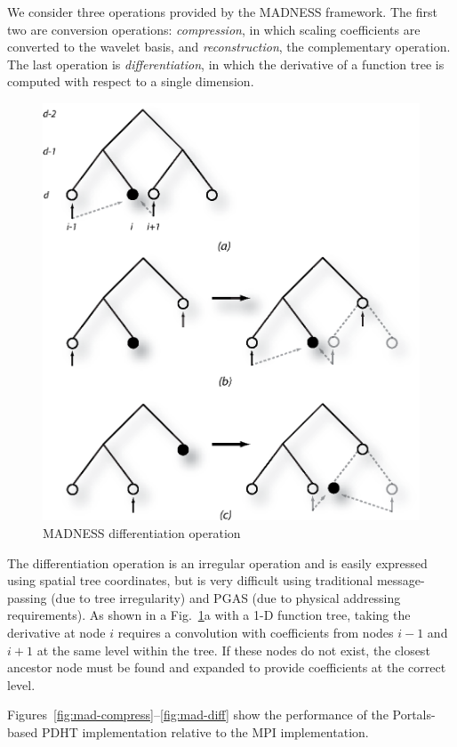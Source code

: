 We consider three operations provided by the MADNESS framework. The
first two are conversion operations: {\em compression}, in which scaling
coefficients are converted to the wavelet basis, and {\em reconstruction}, the
complementary operation. The last operation is {\em differentiation}, in which
the derivative of a function tree is computed with respect to a single
dimension. 

\begin{figure}
  \centering
  \includegraphics[width=.75\linewidth]{figs/diff}
  \caption{MADNESS differentiation operation}
  \label{fig:diff}
\end{figure}


The differentiation operation is an irregular operation and is easily expressed
using spatial tree coordinates, but is very difficult using traditional
message-passing (due to tree irregularity) and PGAS (due to physical addressing
requirements). As shown in a Fig.~\ref{fig:diff}a with a 1-D function tree,
taking the derivative at node $i$ requires a convolution with coefficients
from nodes $i-1$ and $i+1$ at the same level within the tree. If these nodes
do not exist, the closest ancestor node must be found and expanded to provide
coefficients at the correct level. 


Figures~\ref{fig:mad-compress}--\ref{fig:mad-diff} show the performance of the
Portals-based PDHT implementation relative to the MPI implementation.

